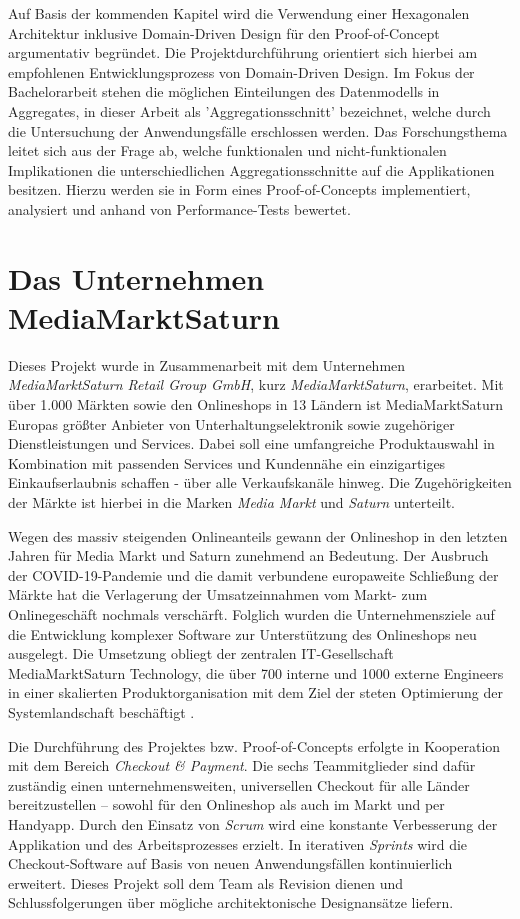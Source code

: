 Auf Basis der kommenden Kapitel wird die Verwendung einer Hexagonalen Architektur inklusive Domain-Driven Design für den Proof-of-Concept argumentativ begründet. Die Projektdurchführung orientiert sich hierbei am empfohlenen Entwicklungsprozess von Domain-Driven Design. Im Fokus der Bachelorarbeit stehen die möglichen Einteilungen des Datenmodells in Aggregates, in dieser Arbeit als 'Aggregationsschnitt' bezeichnet, welche durch die Untersuchung der Anwendungsfälle erschlossen werden. Das Forschungsthema leitet sich aus der Frage ab, welche funktionalen und nicht-funktionalen Implikationen die unterschiedlichen Aggregationsschnitte auf die Applikationen besitzen. Hierzu werden sie in Form eines Proof-of-Concepts implementiert, analysiert und anhand von Performance-Tests bewertet.

\section{Das Unternehmen MediaMarktSaturn}

Dieses Projekt wurde in Zusammenarbeit mit dem Unternehmen \emph{MediaMarktSaturn Retail Group GmbH}, kurz \emph{MediaMarktSaturn}, erarbeitet. Mit über 1.000 Märkten sowie den Onlineshops in 13 Ländern ist MediaMarktSaturn Europas größter Anbieter von Unterhaltungselektronik sowie zugehöriger Dienstleistungen und Services. Dabei soll eine umfangreiche Produktauswahl in Kombination mit passenden Services und Kundennähe ein einzigartiges Einkaufserlaubnis schaffen - über alle Verkaufskanäle hinweg. Die Zugehörigkeiten der Märkte ist hierbei in die Marken \emph{Media Markt} und \emph{Saturn} unterteilt. \cite{mms.Unternehmen}

Wegen des massiv steigenden Onlineanteils gewann der Onlineshop in den letzten Jahren für Media Markt und Saturn zunehmend an Bedeutung. Der Ausbruch der COVID-19-Pandemie und die damit verbundene europaweite Schließung der Märkte hat die Verlagerung der Umsatzeinnahmen vom Markt- zum Onlinegeschäft nochmals verschärft. Folglich wurden die Unternehmensziele auf die Entwicklung komplexer Software zur Unterstützung des Onlineshops neu ausgelegt. Die Umsetzung obliegt der zentralen IT-Gesellschaft MediaMarktSaturn Technology, die über 700 interne und 1000 externe Engineers in einer skalierten Produktorganisation mit dem Ziel der steten Optimierung der Systemlandschaft beschäftigt \cite{mms.technology}.

Die Durchführung des Projektes bzw. Proof-of-Concepts erfolgte in Kooperation mit dem Bereich \emph{Checkout \& Payment}. Die sechs Teammitglieder sind dafür zuständig einen unternehmensweiten, universellen Checkout für alle Länder bereitzustellen – sowohl für den Onlineshop als auch im Markt und per Handyapp. Durch den Einsatz von \emph{\Gls{Scrum}} wird eine konstante Verbesserung der Applikation und des Arbeitsprozesses erzielt. In iterativen \emph{\Glspl{Sprint}} wird die Checkout-Software auf Basis von neuen Anwendungsfällen kontinuierlich erweitert. Dieses Projekt soll dem Team als Revision dienen und Schlussfolgerungen über mögliche architektonische Designansätze liefern.


